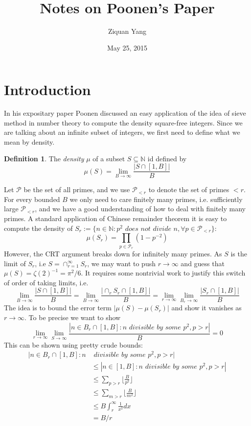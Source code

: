 \documentclass[12pt]{article}
\theoremstyle{plain}
\theoremstyle{definition}
\newtheorem{definition}[equation]{Definition}
\newcommand{\IN}{\mathbb{N}}
\newcommand{\sP}{\mathcal{P}}
\newcommand{\<}{\langle}
\renewcommand{\>}{\rangle}
\begin{document}
%

\title{Notes on Poonen's Paper}
\author{Ziquan Yang}


\date{May 25, 2015}

\maketitle
\tableofcontents

 

\setcounter{section}{0}
\section{Introduction}
In his expositary paper Poonen discussed an easy application of the idea of sieve method in number theory to compute the density square-free integers. Since we are talking about an infinite subset of integers, we first need to define what we mean by density. 
\begin{definition}
\label{Zdef}
The \textit{density} $\mu$ of a subset $S \subseteq \IN$ id defined by
$$\mu(S) = \lim_{B \to \infty} \frac{|S \cap [1, B]|}{B} $$
\end{definition} Let $\sP$ be the set of all primes, and we use $\sP_{<r}$ to denote the set of primes $<r$. For every bounded $B$ we only need to care finitely many primes, i.e. sufficiently large $\sP_{<r}$, and we have a good understanding of how to deal with finitely many primes. A standard application of Chinese remainder theorem it is easy to compute the density of $S_r := \{ n \in \IN : p^2 \textit{ does not divide } n, \forall p \in \sP_{<r} \}$: $$\mu(S_r) = \prod_{p \in \sP_r} (1 - p^{-2})$$
However, the CRT argument breaks down for infinitely many primes. As $S$ is the limit of $S_r$, i.e $S = \cap_{r = 1}^\infty S_r$, we may want to push $r \to \infty$ and guess that $\mu(S) = \zeta(2)^{-1} = \pi^2/6$. It requires some nontrivial work to justify this switch of order of taking limits, i.e. 
$$ \lim_{B \to \infty} \frac{|S \cap [1, B]|}{B} = \lim_{B \to \infty} \frac{|\cap_r S_r \cap [1, B]|}{B} = \lim_{r \to \infty} \lim_{B_r \to \infty} \frac{|S_r \cap [1, B]|}{B}$$
The idea is to bound the error term $|\mu(S) - \mu(S_r)|$ and show it vanishes as $r \to \infty$. To be precise we want to show $$\lim_{r \to \infty} \lim_{S \to \infty} \frac{|n \in B_r \cap [1, B]: n \textit{ divisible by some }p^2, p >r|}{B} = 0$$
This can be shown using pretty crude bounds:
\begin{align*} |n \in B_r \cap [1, B]: n & \textit{ divisible by some }p^2, p >r| \\ &\le |n \in [1, B]: n \textit{ divisible by some }p^2, p >r| \\ &\le \sum_{p > r} \lfloor \frac{B}{p^2} \rfloor \\
&\le \sum_{m > r} \lfloor \frac{B}{m^2} \rfloor \\
&\le B \int_r^\infty \frac{1}{x^2} dx \\
&= B/r
\end{align*}
\end{document}
